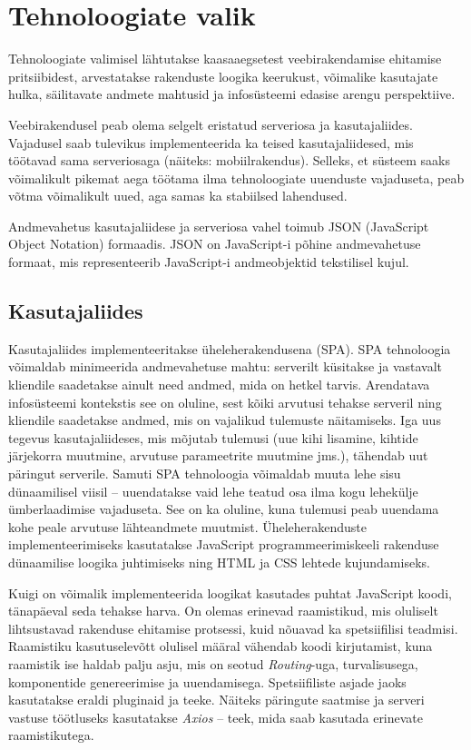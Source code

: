 \section{Tehnoloogiate valik}
Tehnoloogiate valimisel lähtutakse kaasaaegsetest veebirakendamise ehitamise pritsiibidest, arvestatakse
rakenduste loogika keerukust, võimalike kasutajate hulka, säilitavate andmete mahtusid ja infosüsteemi
edasise arengu perspektiive.

Veebirakendusel peab olema selgelt eristatud serveriosa ja kasutajaliides. Vajadusel saab tulevikus 
implementeerida ka teised kasutajaliidesed, mis töötavad sama serveriosaga (näiteks: mobiilrakendus).
Selleks, et süsteem saaks võimalikult pikemat aega töötama ilma tehnoloogiate uuenduste vajaduseta,
peab võtma võimalikult uued, aga samas ka stabiilsed lahendused. 

Andmevahetus kasutajaliidese ja serveriosa vahel toimub JSON (JavaScript Object Notation) formaadis.
JSON on JavaScript-i põhine andmevahetuse formaat, mis representeerib JavaScript-i andmeobjektid
tekstilisel kujul. 

\subsection{Kasutajaliides}
Kasutajaliides implementeeritakse üheleherakendusena (SPA). SPA tehnoloogia võimaldab minimeerida andmevahetuse mahtu:
serverilt küsitakse ja vastavalt kliendile saadetakse ainult need andmed, mida on hetkel tarvis. Arendatava infosüsteemi
kontekstis see on oluline, sest kõiki arvutusi tehakse serveril ning kliendile saadetakse andmed, mis on 
vajalikud tulemuste näitamiseks. Iga uus tegevus kasutajaliideses, mis mõjutab tulemusi (uue kihi lisamine, 
kihtide järjekorra muutmine, arvutuse parameetrite muutmine jms.), tähendab uut päringut serverile. 
Samuti SPA tehnoloogia võimaldab muuta lehe sisu dünaamilisel viisil -- uuendatakse vaid lehe teatud 
osa ilma kogu lehekülje ümberlaadimise vajaduseta. See on ka oluline, kuna tulemusi peab uuendama 
kohe peale arvutuse lähteandmete muutmist. Üheleherakenduste implementeerimiseks kasutatakse JavaScript
programmeerimiskeeli rakenduse dünaamilise loogika juhtimiseks ning HTML ja CSS lehtede kujundamiseks.

Kuigi on võimalik implementeerida loogikat kasutades puhtat JavaScript koodi, tänapäeval seda tehakse
harva. On olemas erinevad raamistikud, mis oluliselt lihtsustavad rakenduse ehitamise protsessi, kuid 
nõuavad ka spetsiifilisi teadmisi. Raamistiku kasutuselevõtt olulisel määral vähendab koodi kirjutamist,
kuna raamistik ise haldab palju asju, mis on seotud \textit{Routing}-uga, turvalisusega, komponentide
genereerimise ja uuendamisega. Spetsiifiliste asjade jaoks kasutatakse eraldi pluginaid ja teeke. Näiteks
päringute saatmise ja serveri vastuse töötluseks kasutatakse \textit{Axios} -- teek, mida saab kasutada 
erinevate raamistikutega.

